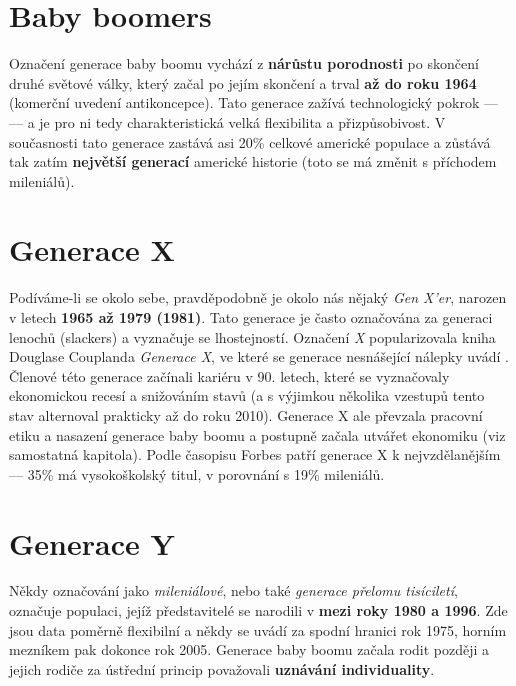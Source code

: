 \section{Baby boomers}\label{sec:baby-boomers}
Označení generace baby boomu vychází z \textbf{nárůstu porodnosti} po skončení druhé světové války, který začal po jejím skončení a trval \textbf{až do roku 1964} (komerční uvedení antikoncepce).\cite{bergh2012coolznacky} Tato generace zažívá technologický pokrok --- --- a je pro ni tedy charakteristická velká flexibilita a přizpůsobivost.
V současnosti tato generace zastává asi 20\rm \% celkové americké populace a zůstává tak zatím \textbf{největší generací} americké historie\cite{investopedia2019babyboomers} (toto se má změnit s příchodem mileniálů).


\section{Generace X}\label{sec:generace-x}
Podíváme-li se okolo sebe, pravděpodobně je okolo nás nějaký \textit{Gen X'er}, narozen v letech \textbf{1965 až 1979 (1981)}. Tato generace je často označována za generaci lenochů (slackers) a vyznačuje se lhostejností. Označení \textit{X} popularizovala kniha Douglase Couplanda \textit{Generace X}, ve které se generace nesnášející nálepky uvádí .\cite{bergh2012coolznacky}
Členové této generace začínali kariéru v 90. letech, které se vyznačovaly ekonomickou recesí a snižováním stavů (a s výjimkou několika vzestupů tento stav alternoval prakticky až do roku 2010\cite{kotler2009chaotika}). Generace X ale převzala pracovní etiku a nasazení generace baby boomu a postupně začala utvářet ekonomiku (viz samostatná kapitola). Podle časopisu Forbes patří generace X k nejvzdělanějším --- 35\rm \% má vysokoškolský titul, v porovnání s 19\rm \% mileniálů.\cite{forbes2019generationX}


\section{Generace Y}\label{sec:generace-y}
Někdy označování jako \textit{mileniálové}, nebo také \textit{generace přelomu tisíciletí}, označuje populaci, jejíž představitelé se narodili v \textbf{mezi roky 1980 a 1996}. Zde jsou data poměrně flexibilní a někdy se uvádí za spodní hranici rok 1975, horním mezníkem pak dokonce rok 2005.\cite{rezlerova2007generacey} Generace baby boomu začala rodit později a jejich rodiče za ústřední princip považovali \textbf{uznávání individuality}.\cite{bergh2012coolznacky}

